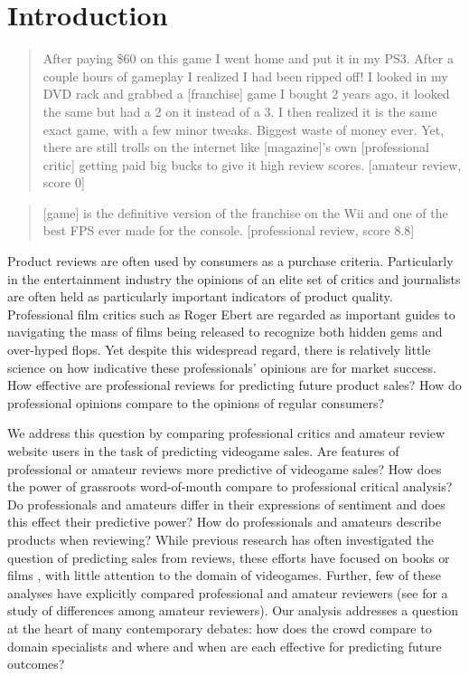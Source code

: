 \documentclass[letterpaper]{article}
\begin{document}
\section{Introduction}
\begin{quote}
After paying \$60 on this game I went home and put it in my PS3. After a couple hours of gameplay I realized I had been ripped off! I looked in my DVD rack and grabbed a [franchise] game I bought 2 years ago, it looked the same but had a 2 on it instead of a 3. I then realized it is the same exact game, with a few minor tweaks. Biggest waste of money ever. Yet, there are still trolls on the internet like [magazine]'s own [professional critic] getting paid big bucks to give it high review scores. [amateur review, score 0]
\end{quote}

\begin{quote}
[game] is the definitive version of the franchise on the Wii and one of the best FPS ever made for the console. [professional review, score 8.8]
\end{quote}

Product reviews are often used by consumers as a purchase criteria. Particularly in the entertainment industry the opinions of an elite set of critics and journalists are often held as particularly important indicators of product quality. Professional film critics such as Roger Ebert are regarded as important guides to navigating the mass of films being released to recognize both hidden gems and over-hyped flops. Yet despite this widespread regard, there is relatively little science on how indicative these professionals' opinions are for market success. How effective are professional reviews for predicting future product sales? How do professional opinions compare to the opinions of regular consumers?

We address this question by comparing professional critics and amateur review website users in the task of predicting videogame sales. Are features of professional or amateur reviews more predictive of videogame sales? How does the power of grassroots word-of-mouth compare to professional critical analysis? Do professionals and amateurs differ in their expressions of sentiment and does this effect their predictive power? How do professionals and amateurs describe products when reviewing? While previous research has often investigated the question of predicting sales from reviews, these efforts have focused on books \cite{gruhl2005predictive} or films \cite{dellarocas2007exploring,yu2012mining,duan2008online,liu2001word}, with little attention to the domain of videogames.
Further, few of these analyses have explicitly compared professional and amateur reviewers (see \cite{gilbert2010deja} for a study of differences among amateur reviewers). Our analysis addresses a question at the heart of many contemporary debates: how does the crowd compare to domain specialists and where and when are each effective for predicting future outcomes?
\end{document}
